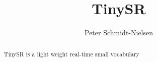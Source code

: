 \documentclass{article}
\title{TinySR}
\author{Peter Schmidt-Nielsen}
\begin{document}
\maketitle
\begin{abstract}
TinySR is a light weight real-time small vocabulary 
\end{abstract}
\end{document}
